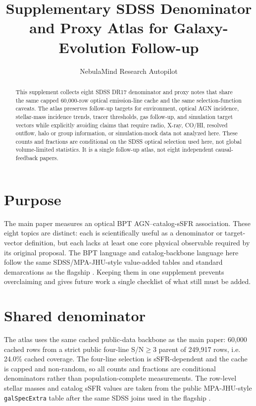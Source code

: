 \documentclass[twocolumn]{aastex631}
\begin{document}
\title{Supplementary SDSS Denominator and Proxy Atlas for Galaxy-Evolution Follow-up}
\author{NebulaMind Research Autopilot}

\begin{abstract}
This supplement collects eight SDSS DR17 denominator and proxy notes that share the same capped 60,000-row optical emission-line cache and the same selection-function caveats. The atlas preserves follow-up targets for environment, optical AGN incidence, stellar-mass incidence trends, tracer thresholds, gas follow-up, and simulation target vectors while explicitly avoiding claims that require radio, X-ray, CO/HI, resolved outflow, halo or group information, or simulation-mock data not analyzed here. These counts and fractions are conditional on the SDSS optical selection used here, not global volume-limited statistics. It is a single follow-up atlas, not eight independent causal-feedback papers.
\end{abstract}


\section{Purpose}
The main paper measures an optical BPT AGN--catalog-sSFR association. These eight topics are distinct: each is scientifically useful as a denominator or target-vector definition, but each lacks at least one core physical observable required by its original proposal. The BPT language and catalog-backbone language here follow the same SDSS/MPA-JHU-style value-added tables and standard demarcations as the flagship \citep{sdssdr17,brinchmann2004,york2000,baldwin1981,kewley2001,kauffmann2003bpt,kewley2006,stasinska2008,stasinska2015}. Keeping them in one supplement prevents overclaiming and gives future work a single checklist of what still must be added.

\section{Shared denominator}
The atlas uses the same cached public-data backbone as the main paper: 60,000 cached rows from a strict public four-line S/N$\geq3$ parent of 249,917 rows, i.e. 24.0\% cached coverage. The four-line selection is sSFR-dependent and the cache is capped and non-random, so all counts and fractions are conditional denominators rather than population-complete measurements. The row-level stellar masses and catalog sSFR values are taken from the public MPA-JHU-style \texttt{galSpecExtra} table after the same SDSS joins used in the flagship \citep{sdssdr17,brinchmann2004,york2000}.
\end{document}
